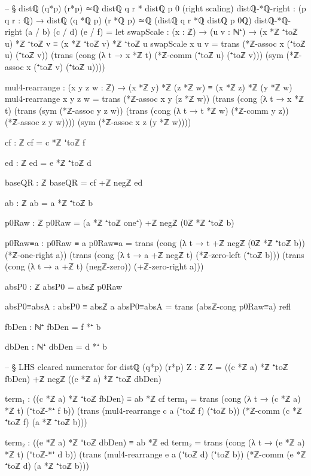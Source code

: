 \documentclass[11pt,a4paper]{book}
\begin{document}
\begin{code}
-- § distℚ (q*p) (r*p) ≃ℚ distℚ q r * distℚ p 0 (right scaling)
distℚ-*ℚ-right : (p q r : ℚ) → distℚ (q *ℚ p) (r *ℚ p) ≃ℚ (distℚ q r *ℚ distℚ p 0ℚ)
distℚ-*ℚ-right (a / b) (c / d) (e / f) =
  let
    swapScale : (x : ℤ) → (u v : ℕ⁺) → (x *ℤ ⁺toℤ u) *ℤ ⁺toℤ v ≡ (x *ℤ ⁺toℤ v) *ℤ ⁺toℤ u
    swapScale x u v =
      trans
        (*ℤ-assoc x (⁺toℤ u) (⁺toℤ v))
        (trans
          (cong (λ t → x *ℤ t) (*ℤ-comm (⁺toℤ u) (⁺toℤ v)))
          (sym (*ℤ-assoc x (⁺toℤ v) (⁺toℤ u))))

    mul4-rearrange : (x y z w : ℤ) → (x *ℤ y) *ℤ (z *ℤ w) ≡ (x *ℤ z) *ℤ (y *ℤ w)
    mul4-rearrange x y z w =
      trans
        (*ℤ-assoc x y (z *ℤ w))
        (trans
          (cong (λ t → x *ℤ t)
            (trans
              (sym (*ℤ-assoc y z w))
              (trans
                (cong (λ t → t *ℤ w) (*ℤ-comm y z))
                (*ℤ-assoc z y w))))
          (sym (*ℤ-assoc x z (y *ℤ w))))

    cf : ℤ
    cf = c *ℤ ⁺toℤ f

    ed : ℤ
    ed = e *ℤ ⁺toℤ d

    baseQR : ℤ
    baseQR = cf +ℤ negℤ ed

    ab : ℤ
    ab = a *ℤ ⁺toℤ b

    p0Raw : ℤ
    p0Raw = (a *ℤ ⁺toℤ one⁺) +ℤ negℤ (0ℤ *ℤ ⁺toℤ b)

    p0Raw≡a : p0Raw ≡ a
    p0Raw≡a =
      trans
        (cong (λ t → t +ℤ negℤ (0ℤ *ℤ ⁺toℤ b)) (*ℤ-one-right a))
        (trans
          (cong (λ t → a +ℤ negℤ t) (*ℤ-zero-left (⁺toℤ b)))
          (trans
            (cong (λ t → a +ℤ t) (negℤ-zero))
            (+ℤ-zero-right a)))

    absP0 : ℤ
    absP0 = absℤ p0Raw

    absP0≡absA : absP0 ≡ absℤ a
    absP0≡absA = trans (absℤ-cong p0Raw≡a) refl

    fbDen : ℕ⁺
    fbDen = f *⁺ b

    dbDen : ℕ⁺
    dbDen = d *⁺ b

    -- § LHS cleared numerator for distℚ (q*p) (r*p)
    Z : ℤ
    Z = ((c *ℤ a) *ℤ ⁺toℤ fbDen) +ℤ negℤ ((e *ℤ a) *ℤ ⁺toℤ dbDen)

    term₁ : ((c *ℤ a) *ℤ ⁺toℤ fbDen) ≡ ab *ℤ cf
    term₁ =
      trans
        (cong (λ t → (c *ℤ a) *ℤ t) (⁺toℤ-*⁺ f b))
        (trans
          (mul4-rearrange c a (⁺toℤ f) (⁺toℤ b))
          (*ℤ-comm (c *ℤ ⁺toℤ f) (a *ℤ ⁺toℤ b)))

    term₂ : ((e *ℤ a) *ℤ ⁺toℤ dbDen) ≡ ab *ℤ ed
    term₂ =
      trans
        (cong (λ t → (e *ℤ a) *ℤ t) (⁺toℤ-*⁺ d b))
        (trans
          (mul4-rearrange e a (⁺toℤ d) (⁺toℤ b))
          (*ℤ-comm (e *ℤ ⁺toℤ d) (a *ℤ ⁺toℤ b)))


\end{code}
\end{document}
